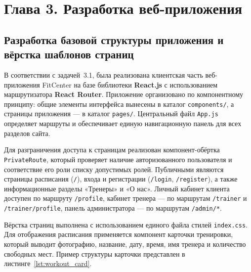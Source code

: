 
\section*{Глава 3. Разработка веб-приложения}

\subsection{Разработка базовой структуры приложения и вёрстка шаблонов страниц}

В соответствии с задачей~3.1, была реализована клиентская часть веб-приложения
FitCenter на базе библиотеки \textbf{React.js} с использованием маршрутизатора
\textbf{React Router}. Приложение организовано по компонентному принципу:
общие элементы интерфейса вынесены в каталог \texttt{components/}, а страницы
приложения --- в каталог \texttt{pages/}. Центральный файл \texttt{App.js}
определяет маршруты и обеспечивает единую навигационную панель для всех
разделов сайта.

Для разграничения доступа к страницам реализован компонент-обёртка
\texttt{PrivateRoute}, который проверяет наличие авторизованного пользователя
и соответствие его роли списку допустимых ролей. Публичными являются страницы
расписания (\texttt{/}), входа и регистрации (\texttt{/login}, \texttt{/register}),
а также информационные разделы «Тренеры» и «О нас». Личный кабинет клиента
доступен по маршруту \texttt{/profile}, кабинет тренера --- по маршрутам
\texttt{/trainer} и \texttt{/trainer/profile}, панель администратора --- по
маршрутам \texttt{/admin/*}.

Вёрстка страниц выполнена с использованием единого файла стилей
\texttt{index.css}. Для отображения расписания применяется компонент карточки
тренировки, который выводит фотографию, название, дату, время, имя тренера и
количество свободных мест. Пример структуры карточки представлен
в листинге~\ref{lst:workout_card}.
\clearpage

